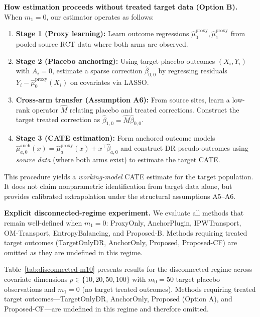 {\medskip
\noindent
\textbf{How estimation proceeds without treated target data (Option B).}
When $m_1 = 0$, our estimator operates as follows:
\begin{enumerate}
\item \textbf{Stage 1 (Proxy learning):} Learn outcome regressions $\widehat{\mu}_0^{\text{proxy}}, \widehat{\mu}_1^{\text{proxy}}$ from pooled source RCT data where both arms are observed.
\item \textbf{Stage 2 (Placebo anchoring):} Using target placebo outcomes $(X_i, Y_i)$ with $A_i=0$, estimate a sparse correction $\widehat{\beta}_{0,0}$ by regressing residuals $Y_i - \widehat{\mu}_0^{\text{proxy}}(X_i)$ on covariates via LASSO.
\item \textbf{Cross-arm transfer (Assumption A6):} From source sites, learn a low-rank operator $\widehat{M}$ relating placebo and treated corrections. Construct the target treated correction as $\widehat{\beta}_{1,0} = \widehat{M} \widehat{\beta}_{0,0}$.
\item \textbf{Stage 3 (CATE estimation):} Form anchored outcome models $\widehat{\mu}_{a,0}^{\text{anch}}(x) = \widehat{\mu}_a^{\text{proxy}}(x) + x^\top \widehat{\beta}_{a,0}$ and construct DR pseudo-outcomes using \emph{source data} (where both arms exist) to estimate the target CATE.
\end{enumerate}

This procedure yields a \emph{working-model} CATE estimate for the target population. It does not claim nonparametric identification from target data alone, but provides calibrated extrapolation under the structural assumptions A5--A6.

\medskip
\noindent
\textbf{Explicit disconnected-regime experiment.}
We evaluate all methods that remain well-defined when $m_1 = 0$: ProxyOnly, AnchorPlugin, IPWTransport, OM-Transport, EntropyBalancing, and Proposed-B. Methods requiring treated target outcomes (TargetOnlyDR, AnchorOnly, Proposed, Proposed-CF) are omitted as they are undefined in this regime.

Table~\ref{tab:disconnected-m10} presents results for the disconnected regime across covariate dimensions $p \in \{10, 20, 50, 100\}$ with $m_0 = 50$ target placebo observations and $m_1 = 0$ (no target treated outcomes). Methods requiring treated target outcomes---TargetOnlyDR, AnchorOnly, Proposed (Option A), and Proposed-CF---are undefined in this regime and therefore omitted.



}
